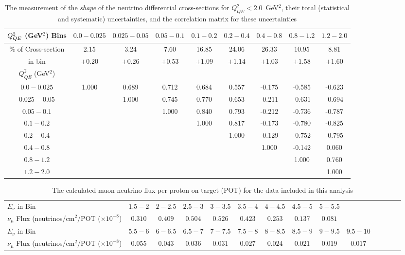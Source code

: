 \begingroup
\squeezetable
\begin{table}[!h]
\tabcolsep=0.11cm
\begin{tabular}{c|cccccccc}
\hline
$Q^2_{QE}$ (GeV$^2$) Bins & $0.0 - 0.025$ & $0.025 - 0.05$ & $0.05 - 0.1$ & $0.1 - 0.2$ & $0.2 - 0.4$ & $0.4 - 0.8$ & $0.8 - 1.2$ & $1.2 - 2.0$ \\ 
\hline
\% of Cross-section  & 
2.15	& 3.24	& 7.60	& 16.85	& 24.06	& 26.33	& 10.95	& 8.81	\\
in bin  &$\pm	0.20	$&$\pm	0.26	$&$\pm	0.53	$&$\pm	1.09	$&$\pm	1.14	$&$\pm	1.03	$&$\pm	1.58	$&$\pm	1.60$	\\
\hline
$Q^2_{QE}$ (GeV$^2$) & & & & & & & & \\
$0.0 - 0.025$  & 1.000 & 0.689 & 0.712 & 0.684 & 0.557 & -0.175 & -0.585 & -0.623 \\ 
$0.025 - 0.05$  &  & 1.000 & 0.745 & 0.770 & 0.653 & -0.211 & -0.631 & -0.694 \\ 
$0.05 - 0.1$  &  &  & 1.000 & 0.840 & 0.793 & -0.212 & -0.736 & -0.787 \\ 
$0.1 - 0.2$  &  &  &  & 1.000 & 0.817 & -0.173 & -0.780 & -0.825 \\ 
$0.2 - 0.4$  &  &  &  &  & 1.000 & -0.129 & -0.752 & -0.795 \\ 
$0.4 - 0.8$  &  &  &  &  &  & 1.000 & -0.142 & 0.060 \\ 
$0.8 - 1.2$  &  &  &  &  &  &  & 1.000 & 0.760 \\ 
$1.2 - 2.0$  &  &  &  &  &  &  &  & 1.000 \\ 
\hline
\end{tabular}
\caption{The measurement of the {\em shape} of the neutrino differential cross-sections for $Q^2_{QE}<2.0$~GeV$^2$, their total (statistical and systematic) uncertainties, and the correlation matrix for these uncertainties}
\end{table}
\endgroup

\begingroup
\squeezetable
\begin{table}[b]
\begin{tabular}{l|ccccccccccccc}
\hline 
$E_\nu$ in Bin & 
$1.5 - 2$ &
$2 - 2.5$ &
$2.5 - 3$ &
$3 - 3.5$ &
$3.5 - 4$ &
$4 - 4.5$ &
$4.5 - 5$ &
$5 - 5.5$ \\
$\nu_\mu$ Flux
(neutrinos/cm$^2$/POT ($\times 10^{-8}$) &
$0.310	$ &
$0.409	$&
$0.504	$&
$0.526   $&
$0.423	$&
$0.253	$&
$0.137	$&
$0.081	$ \\
\hline
$E_\nu$ in Bin & 
$5.5 - 6$ &
$6 - 6.5$ &
$6.5 - 7$ &
$7 - 7.5$ &
$7.5 - 8$ &
$8 - 8.5$ &
$8.5 - 9$ &
$9 - 9.5$ &
$9.5 - 10$ \\
$\nu_\mu$ Flux
(neutrinos/cm$^2$/POT ($\times 10^{-8}$) &
$0.055   $&
$0.043	$&
$0.036	$&
$0.031	$&
$0.027	$&
$0.024	$&
$0.021	$&
$0.019	$&
$0.017	$ \\ \hline
\end{tabular}
\caption{The calculated muon neutrino flux per proton on target (POT) for the data included in this analysis}
\end{table}
\endgroup
